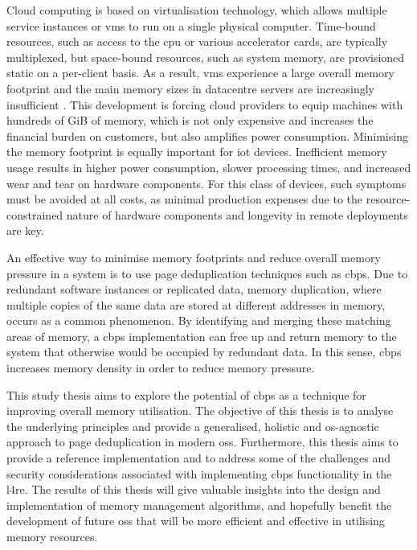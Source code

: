 Cloud computing is based on virtualisation technology, which allows multiple service instances or \acp{vm} to run on a single physical computer.
Time-bound resources, such as access to the \ac{cpu} or various accelerator cards, are typically multiplexed, but space-bound resources, such as system memory, are provisioned static on a per-client basis.
As a result, \acp{vm} experience a large overall memory footprint and the main memory sizes in datacentre servers are increasingly insufficient \cite{pm2019}.
This development is forcing cloud providers to equip machines with hundreds of GiB of memory, which is not only expensive and increases the financial burden on customers, but also amplifies power consumption.
Minimising the memory footprint is equally important for \Ac{iot} devices.
Inefficient memory usage results in higher power consumption, slower processing times, and increased wear and tear on hardware components.
For this class of devices, such symptoms must be avoided at all costs, as minimal production expenses due to the resource-constrained nature of hardware components and longevity in remote deployments are key.

An effective way to minimise memory footprints and reduce overall memory pressure in a system is to use page deduplication techniques such as \acf{cbps}.
Due to redundant software instances or replicated data, memory duplication, where multiple copies of the same data are stored at different addresses in memory, occurs as a common phenomenon.
By identifying and merging these matching areas of memory, a \ac{cbps} implementation can free up and return memory to the system that otherwise would be occupied by redundant data.
In this sense, \ac{cbps} increases memory density in order to reduce memory pressure.

This study thesis aims to explore the potential of \ac{cbps} as a technique for improving overall memory utilisation.
The objective of this thesis is to analyse the underlying principles and provide a generalised, holistic and \ac{os}-agnostic approach to page deduplication in modern \acp{os}.
Furthermore, this thesis aims to provide a reference implementation and to address some of the challenges and security considerations associated with implementing \ac{cbps} functionality in the \acl{l4re}.
The results of this thesis will give valuable insights into the design and implementation of memory management algorithms, and hopefully benefit the development of future \acp{os} that will be more efficient and effective in utilising memory resources.
